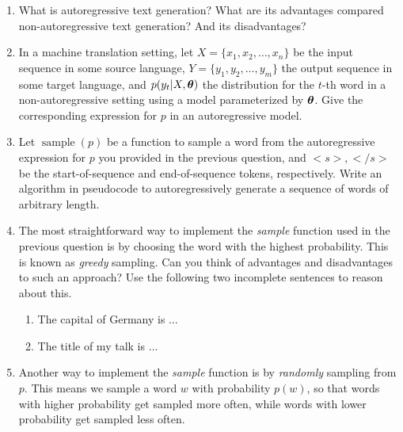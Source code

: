 \documentclass[11pt,a4paper]{article}
\begin{document}
\begin{enumerate}[label=(\alph*)]
    \item What is autoregressive text generation? What are its advantages
          compared non-autoregressive text generation? And its disadvantages?
    \item In a machine translation setting, let $X = \{x_1, x_2, \ldots, x_n\}$
          be the input sequence in some source language,
          $Y = \{y_1, y_2, \ldots, y_m\}$ the output sequence in some target
          language, and $p(y_t|X,{\boldsymbol{\theta}})$ the distribution for the $t$-th word
          in a non-autoregressive setting using a model parameterized by
          ${\boldsymbol{\theta}}$.
          Give the corresponding expression for $p$ in an autoregressive model.
    \item Let $\operatorname{sample}(p)$ be a function to sample a word
          from the autoregressive expression for $p$ you provided in the
          previous question, and $<s>, </s>$ be the start-of-sequence and
          end-of-sequence tokens, respectively.
          Write an algorithm in pseudocode to autoregressively generate a
          sequence of words of arbitrary length.
    \item The most straightforward way to implement the \emph{sample}
          function used in the previous question is by choosing the word with
          the highest probability. This is known as \emph{greedy} sampling.
          Can you think of advantages and disadvantages to such an approach?
          Use the following two incomplete sentences to reason about this.
          \begin{enumerate}[label=(\roman*)]
              \item The capital of Germany is $\ldots$
              \item The title of my talk is $\ldots$
          \end{enumerate}
    \item Another way to implement the \emph{sample} function is by
          \emph{randomly} sampling from $p$.
          This means we sample a word $w$ with probability $p(w)$, so that words
          with higher probability get sampled more often, while words with lower
          probability get sampled less often.

\end{enumerate}
\end{document}
